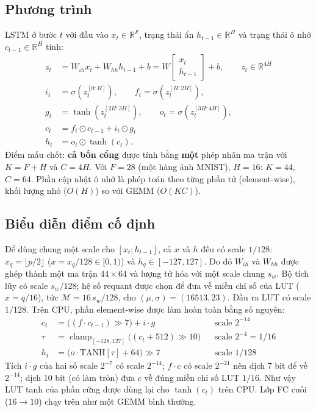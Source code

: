 \subsection{Phương trình}
LSTM \cite{hochreiter1997lstm} ở bước $t$ với đầu vào $x_t\in\mathbb{R}^F$, trạng thái ẩn $h_{t-1}\in\mathbb{R}^H$ và trạng thái ô nhớ $c_{t-1}\in\mathbb{R}^H$ tính:
\begin{align}
  z_t &= W_{ih}x_t + W_{hh}h_{t-1} + b = W\begin{bmatrix}x_t\\ h_{t-1}\end{bmatrix} + b, \qquad z_t\in\mathbb{R}^{4H}\\
  i_t &= \sigma(z_t^{[0:H]}),\qquad f_t = \sigma(z_t^{[H:2H]}),\\
  g_t &= \tanh(z_t^{[2H:3H]}),\qquad o_t = \sigma(z_t^{[3H:4H]}),\\
  c_t &= f_t\odot c_{t-1} + i_t\odot g_t\\
  h_t &= o_t\odot\tanh(c_t).
\end{align}
Điểm mấu chốt: \textbf{cả bốn cổng} được tính bằng \textbf{một} phép nhân ma trận với $K=F+H$ và $C=4H$. Với $F=28$ (một hàng ảnh MNIST), $H=16$: $K=44$, $C=64$. Phần cập nhật ô nhớ là phép toán theo từng phần tử (element-wise), khối lượng nhỏ ($O(H)$) so với GEMM ($O(KC)$).

\subsection{Biểu diễn điểm cố định}
\label{sec:lstm-fixed}
Để dùng chung một scale cho $[x_t;h_{t-1}]$, cả $x$ và $h$ đều có scale $1/128$: $x_q=\lfloor p/2\rfloor$ ($x=x_q/128\in[0,1)$) và $h_q\in[-127,127]$. Do đó $W_{ih}$ và $W_{hh}$ được ghép thành một ma trận $44\times64$ và lượng tử hóa với một scale chung $s_w$. Bộ tích lũy có scale $s_w/128$; hệ số requant được chọn để đưa về miền chỉ số của LUT ($x=q/16$), tức $\mathcal{M}=16\,s_w/128$, cho $(\mu,\sigma)=(16513,23)$. Đầu ra LUT có scale $1/128$. Trên CPU, phần element-wise được làm hoàn toàn bằng số nguyên:
\begin{align}
  c_t &= \big((f\cdot c_{t-1})\gg7\big) + i\cdot g && \text{scale } 2^{-14}\\
  \tau &= \operatorname{clamp}_{[-128,127]}\big((c_t+512)\gg10\big) && \text{scale } 2^{-4}=1/16\\
  h_t &= \big(o\cdot\mathrm{TANH}[\tau] + 64\big)\gg7 && \text{scale } 1/128
\end{align}
Tích $i\cdot g$ của hai số scale $2^{-7}$ có scale $2^{-14}$; $f\cdot c$ có scale $2^{-21}$ nên dịch 7 bit để về $2^{-14}$; dịch 10 bit (có làm tròn) đưa $c$ về đúng miền chỉ số LUT $1/16$. Như vậy LUT tanh của phần cứng được dùng lại cho $\tanh(c_t)$ trên CPU. Lớp FC cuối ($16\to10$) chạy trên \NPU{} như một GEMM bình thường.
